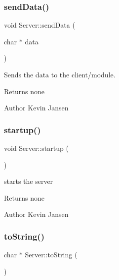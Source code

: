 \subsubsection{\texorpdfstring{send\+Data()}{sendData()}}
{\footnotesize\ttfamily void Server\+::send\+Data (\begin{DoxyParamCaption}\item[{char $\ast$}]{data }\end{DoxyParamCaption})}



Sends the data to the client/module. 

\begin{DoxyReturn}{Returns}
none 
\end{DoxyReturn}
\begin{DoxyAuthor}{Author}
Kevin Jansen 
\end{DoxyAuthor}
\mbox{\label{classServer_aaa7517710dd809ba4d965eb83801fd05}} 
\subsubsection{\texorpdfstring{startup()}{startup()}}
{\footnotesize\ttfamily void Server\+::startup (\begin{DoxyParamCaption}{ }\end{DoxyParamCaption})}



starts the server 

\begin{DoxyReturn}{Returns}
none 
\end{DoxyReturn}
\begin{DoxyAuthor}{Author}
Kevin Jansen 
\end{DoxyAuthor}
\mbox{\label{classServer_aee9a13517df765d3c085fab605f24be4}} 
\subsubsection{\texorpdfstring{to\+String()}{toString()}}
{\footnotesize\ttfamily char $\ast$ Server\+::to\+String (\begin{DoxyParamCaption}{ }\end{DoxyParamCaption})}



